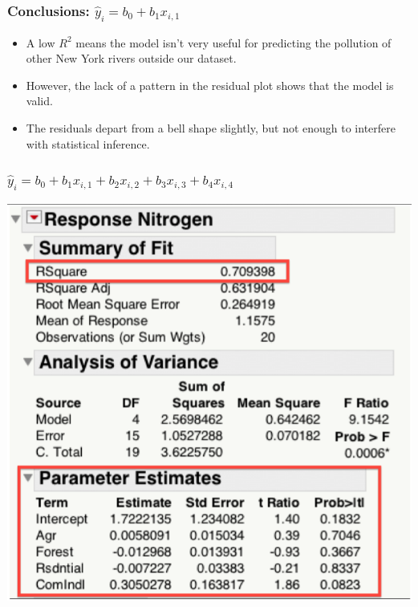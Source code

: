 \documentclass[handout]{beamer}
\providecommand{\wh}[1]{\widehat{#1}}
\numberwithin{equation}{section}
\begin{document}
\begin{frame}
\frametitle{Conclusions: $\wh{y}_i = b_0 + b_1 x_{i, 1} $}
\begin{itemize}
\pause \item A low $R^2$ means the model isn't very useful for predicting the pollution of other New York rivers outside our dataset.
\pause \item However, the lack of a pattern in the residual plot shows that the model is valid.
\pause \item The residuals depart from a bell shape slightly, but not enough to interfere with statistical inference.
\end{itemize}
\end{frame}


\begin{frame}
\frametitle{$\wh{y}_i = b_0 + b_1 x_{i, 1}  + b_2 x_{i, 2} + b_3 x_{i, 3} + b_4 x_{i, 4}  $}
 \includegraphics{../../fig/riversfullmodeloutput.png}

\end{frame}
\end{document}

